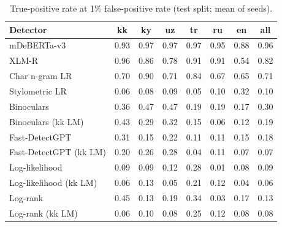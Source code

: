 \begin{table}[t]
\centering
\small
\caption{True-positive rate at 1\% false-positive rate (test split; mean of seeds).}
\label{tab:tpr1}
\begin{tabular}{lccccccc}
\toprule
Detector & kk & ky & uz & tr & ru & en & all \\
\midrule
mDeBERTa-v3 & 0.93 & 0.97 & 0.97 & 0.97 & 0.95 & 0.88 & 0.96 \\
XLM-R & 0.96 & 0.86 & 0.78 & 0.91 & 0.91 & 0.54 & 0.82 \\
Char n-gram LR & 0.70 & 0.90 & 0.71 & 0.84 & 0.67 & 0.65 & 0.71 \\
Stylometric LR & 0.06 & 0.08 & 0.09 & 0.05 & 0.10 & 0.32 & 0.10 \\
Binoculars & 0.36 & 0.47 & 0.47 & 0.19 & 0.19 & 0.17 & 0.30 \\
Binoculars (kk LM) & 0.43 & 0.29 & 0.32 & 0.15 & 0.06 & 0.12 & 0.19 \\
Fast-DetectGPT & 0.31 & 0.15 & 0.22 & 0.11 & 0.11 & 0.15 & 0.18 \\
Fast-DetectGPT (kk LM) & 0.20 & 0.26 & 0.28 & 0.04 & 0.11 & 0.07 & 0.07 \\
Log-likelihood & 0.09 & 0.09 & 0.12 & 0.28 & 0.01 & 0.08 & 0.09 \\
Log-likelihood (kk LM) & 0.06 & 0.13 & 0.05 & 0.21 & 0.12 & 0.04 & 0.06 \\
Log-rank & 0.45 & 0.13 & 0.19 & 0.34 & 0.03 & 0.17 & 0.13 \\
Log-rank (kk LM) & 0.06 & 0.10 & 0.08 & 0.25 & 0.12 & 0.08 & 0.08 \\
\bottomrule
\end{tabular}
\end{table}
